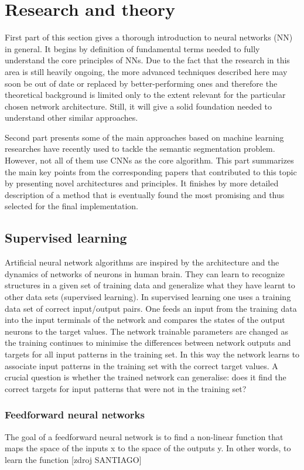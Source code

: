 \chapter{Research and theory}
\label{research}
First part of this section gives a thorough introduction to neural networks (NN) in general. It begins by definition of fundamental terms needed to fully understand the core principles of NNs. Due to the fact that the research in this area is still heavily ongoing, the more advanced techniques described here may soon be out of date or replaced by better-performing ones and therefore the theoretical background is limited only to the extent relevant for the particular chosen network architecture. Still, it will give a solid foundation needed to understand other similar approaches. 

Second part presents some of the main approaches based on machine learning researches have recently used to tackle the semantic segmentation problem. However, not all of them use CNNs as the core algorithm. This part summarizes the main key points from the corresponding papers that contributed to this topic by presenting novel architectures and principles. It finishes by more detailed description of a method that is eventually found the most promising and thus selected for the final implementation.

\section{Supervised learning}
Artificial neural network algorithms are inspired by the architecture and the dynamics
of networks of neurons in human brain. They can learn to recognize structures in a given set of training data and generalize what they have learnt to other data sets (supervised learning). In supervised learning one uses a training data set of correct input/output pairs. One feeds an input from the training data into the input terminals of the network and compares the states of the output neurons to the target values. The network trainable parameters are changed as the training continues to minimise the differences between network outputs and targets for all input patterns in the training set. In this way the network learns to associate input patterns in the training set with the correct target values. A crucial question is whether the trained network can generalise: does it find the correct targets for input patterns that were not in the training set? 

\subsection{Feedforward neural networks}
The goal of a feedforward neural network is to find a non-linear function that maps the space of the inputs x to the space of the outputs y. In other words, to learn the function [zdroj SANTIAGO]

